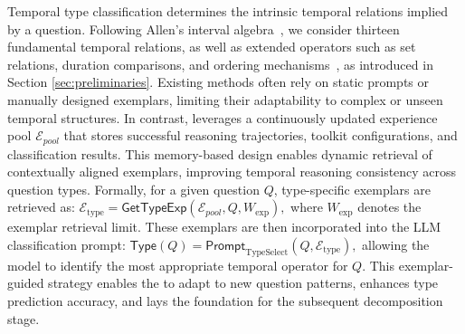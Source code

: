 Temporal type classification determines the intrinsic temporal relations implied by a question.  
Following Allen’s interval algebra~\cite{allen1984towards}, we consider thirteen fundamental temporal relations,  
as well as extended operators such as set relations, duration comparisons, and ordering mechanisms~\cite{TimelineKGQA}, as introduced in Section \ref{sec:preliminaries}.  
Existing methods often rely on static prompts or manually designed exemplars, limiting their adaptability to complex or unseen temporal structures.  
In contrast, \mot leverages a continuously updated experience pool $\mathcal{E}_{pool}$ that stores successful reasoning trajectories, toolkit configurations, and classification results.  
This memory-based design enables dynamic retrieval of contextually aligned exemplars, improving temporal reasoning consistency across question types.  
Formally, for a given question $Q$, type-specific exemplars are retrieved as:
$
\mathcal{E}_{\text{type}} = \textsf{GetTypeExp}(\mathcal{E}_{pool}, Q, W_{\text{exp}}),
$
where $W_{\text{exp}}$ denotes the exemplar retrieval limit.  
These exemplars are then incorporated into the LLM classification prompt:
$
\textsf{Type}(Q) = \textsf{Prompt}_{\text{TypeSelect}}(Q, \mathcal{E}_{\text{type}}),
$
allowing the model to identify the most appropriate temporal operator for $Q$.  
This exemplar-guided strategy enables the \mot to adapt to new question patterns, enhances type prediction accuracy, and lays the foundation for the subsequent decomposition stage.
